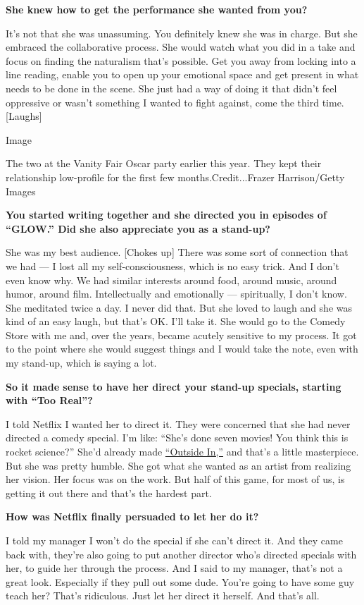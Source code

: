 \textbf{She knew how to get the performance she wanted from you?}

It's not that she was unassuming. You definitely knew she was in charge.
But she embraced the collaborative process. She would watch what you did
in a take and focus on finding the naturalism that's possible. Get you
away from locking into a line reading, enable you to open up your
emotional space and get present in what needs to be done in the scene.
She just had a way of doing it that didn't feel oppressive or wasn't
something I wanted to fight against, come the third time. {[}Laughs{]}

Image

The two at the Vanity Fair Oscar party earlier this year. They kept
their relationship low-profile for the first few months.Credit...Frazer
Harrison/Getty Images

\textbf{You started writing together and she directed you in episodes of
``GLOW.'' Did she also appreciate you as a stand-up?}

She was my best audience. {[}Chokes up{]} There was some sort of
connection that we had --- I lost all my self-consciousness, which is no
easy trick. And I don't even know why. We had similar interests around
food, around music, around humor, around film. Intellectually and
emotionally --- spiritually, I don't know. She meditated twice a day. I
never did that. But she loved to laugh and she was kind of an easy
laugh, but that's OK. I'll take it. She would go to the Comedy Store
with me and, over the years, became acutely sensitive to my process. It
got to the point where she would suggest things and I would take the
note, even with my stand-up, which is saying a lot.

\textbf{So it made sense to have her direct your stand-up specials,
starting with ``Too Real''?}

I told Netflix I wanted her to direct it. They were concerned that she
had never directed a comedy special. I'm like: ``She's done seven
movies! You think this is rocket science?'' She'd already made
\href{https://www.youtube.com/watch?v=s0SdJfplC80}{``Outside In,''} and
that's a little masterpiece. But she was pretty humble. She got what she
wanted as an artist from realizing her vision. Her focus was on the
work. But half of this game, for most of us, is getting it out there and
that's the hardest part.

\textbf{How was Netflix finally persuaded to let her do it?}

I told my manager I won't do the special if she can't direct it. And
they came back with, they're also going to put another director who's
directed specials with her, to guide her through the process. And I said
to my manager, that's not a great look. Especially if they pull out some
dude. You're going to have some guy teach her? That's ridiculous. Just
let her direct it herself. And that's all.

